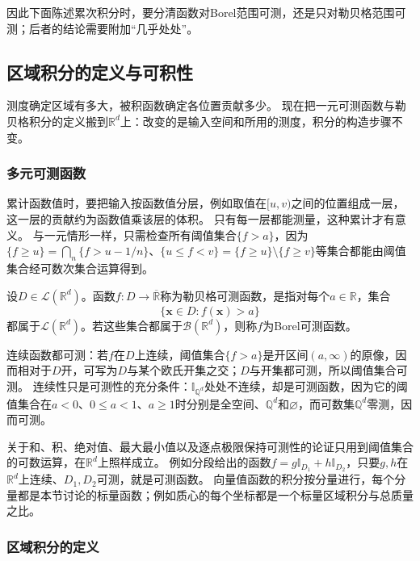 因此下面陈述累次积分时，要分清函数对Borel范围可测，还是只对勒贝格范围可测；后者的结论需要附加“几乎处处”。

\subsection{区域积分的定义与可积性}
\label{sec:multivariable-riemann-lebesgue}

测度确定区域有多大，被积函数确定各位置贡献多少。
现在把一元可测函数与勒贝格积分的定义搬到$\mathbb R^d$上：改变的是输入空间和所用的测度，积分的构造步骤不变。

\subsubsection{多元可测函数}

累计函数值时，要把输入按函数值分层，例如取值在$[u,v)$之间的位置组成一层，这一层的贡献约为函数值乘该层的体积。
只有每一层都能测量，这种累计才有意义。
与一元情形一样，只需检查所有阈值集合$\{f>a\}$，因为$\{f\geq u\}=\bigcap_n\{f>u-1/n\}$、$\{u\leq f<v\}=\{f\geq u\}\setminus\{f\geq v\}$等集合都能由阈值集合经可数次集合运算得到。
\begin{definition}[多元可测函数]
设$D\in\mathcal L(\mathbb R^d)$。函数$f:D\to\overline{\mathbb R}$称为勒贝格可测函数，是指对每个$a\in\mathbb R$，集合
\[
 \{\bm x\in D:f(\bm x)>a\}
\]
都属于$\mathcal L(\mathbb R^d)$。若这些集合都属于$\mathcal B(\mathbb R^d)$，则称$f$为Borel可测函数。
\end{definition}

连续函数都可测：若$f$在$D$上连续，阈值集合$\{f>a\}$是开区间$(a,\infty)$的原像，因而相对于$D$开，可写为$D$与某个欧氏开集之交；$D$与开集都可测，所以阈值集合可测。
连续性只是可测性的充分条件：$\mathbb I_{\mathbb Q^d}$处处不连续，却是可测函数，因为它的阈值集合在$a<0$、$0\leq a<1$、$a\geq1$时分别是全空间、$\mathbb Q^d$和$\varnothing$，而可数集$\mathbb Q^d$零测，因而可测。

关于和、积、绝对值、最大最小值以及逐点极限保持可测性的论证只用到阈值集合的可数运算，在$\mathbb R^d$上照样成立。
例如分段给出的函数$f=g\mathbb I_{D_1}+h\mathbb I_{D_2}$，只要$g,h$在$\mathbb R^d$上连续、$D_1,D_2$可测，就是可测函数。
向量值函数的积分按分量进行，每个分量都是本节讨论的标量函数；例如质心的每个坐标都是一个标量区域积分与总质量之比。

\subsubsection{区域积分的定义}

